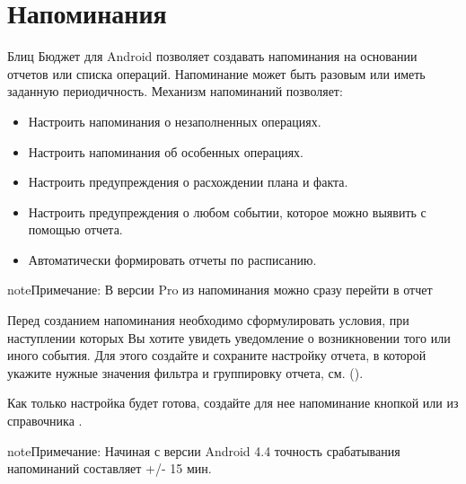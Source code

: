 \documentclass[a4paper,10pt,russian]{sphinxmanual}
\begin{document}
\noindent{}


\chapter{Напоминания}
\label{\detokenize{reminders:chapter-reminders}}\label{\detokenize{reminders:id1}}\label{\detokenize{reminders::doc}}
Блиц Бюджет для Android позволяет создавать напоминания на основании отчетов или списка операций. Напоминание может быть разовым
или иметь заданную периодичность. Механизм напоминаний позволяет:
\begin{itemize}
\item {} 
Настроить напоминания о незаполненных операциях.

\item {} 
Настроить напоминания об особенных операциях.

\item {} 
Настроить предупреждения о расхождении плана и факта.

\item {} 
Настроить предупреждения о любом событии, которое можно выявить с помощью отчета.

\item {} 
Автоматически формировать отчеты по расписанию.

\end{itemize}

\begin{sphinxadmonition}{note}{Примечание:}
В версии Pro из напоминания можно сразу перейти в отчет
\end{sphinxadmonition}

Перед созданием напоминания необходимо сформулировать условия, при наступлении которых Вы хотите увидеть
уведомление о возникновении того или иного события. Для этого создайте и сохраните настройку
отчета, в которой укажите нужные значения фильтра и группировку отчета, см.
{\hyperref[\detokenize{shortcuts:chapter-shortcuts}]{}} ().

Как только настройка будет готова, создайте для нее напоминание кнопкой  или из справочника .

\begin{sphinxadmonition}{note}{Примечание:}
Начиная с версии Android 4.4 точность срабатывания напоминаний составляет +/- 15 мин.
\end{sphinxadmonition}
\end{document}

